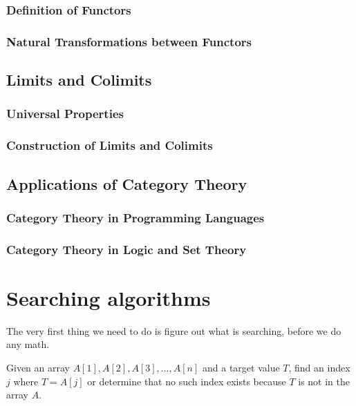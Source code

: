 \subsubsection{Definition of Functors}
\subsubsection{Natural Transformations between Functors}
\subsection{Limits and Colimits}
\subsubsection{Universal Properties}
\subsubsection{Construction of Limits and Colimits}
\subsection{Applications of Category Theory}
\subsubsection{Category Theory in Programming Languages}
\subsubsection{Category Theory in Logic and Set Theory}


\section{Searching algorithms}
    The very first thing we need to do is figure out what is searching, before we do any math.
    \begin{definition}
        Given an array \( A[1], A[2], A[3], \ldots, A[n] \) and a target value \( T \), find an index \( j \) where \( T = A[j] \) or determine that no such index exists because \( T \) is not in the array \( A \).
    \end{definition}
